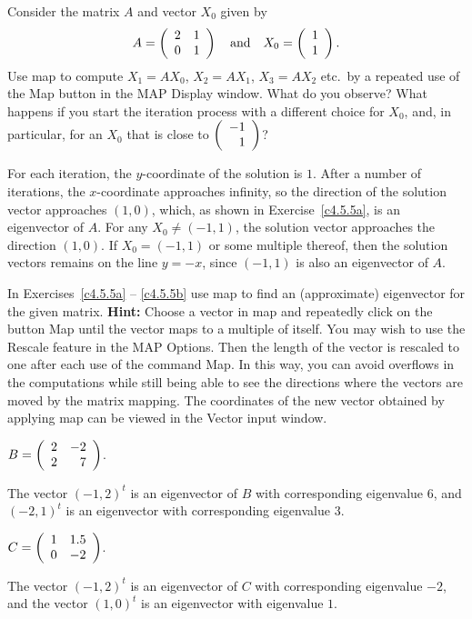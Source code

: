 \documentclass{ximera}
\begin{document}
\CEXER

\begin{exercise} \label{c4.5.6}
Consider the matrix $A$ and vector $X_0$ given by
\[
A=\left(\begin{array}{rr} 2 & 1\\ 0 &1\end{array}\right)\quad\mbox{and}\quad X_0=\left(\begin{array}{r} 1 \\ 1\end{array}\right).
\]
Use {\sf map} to compute $X_1 = AX_0$, $X_2 = AX_1$, $X_3=AX_2$ etc.\ by a
repeated use of the {\sf Map} button in the {\sf MAP Display} window.  What
do you observe?  What happens if you start the iteration process with a
different choice for $X_0$, and, in particular, for an $X_0$ that is close
to $\left(\begin{array}{r} -1 \\ 1\end{array}\right)$?

\begin{solution}

For each iteration, the $y$-coordinate of the solution is $1$.  After a
number of iterations, the $x$-coordinate approaches infinity, so the
direction of the solution vector approaches $(1,0)$, which, as shown
in Exercise~\ref{c4.5.5a}, is an eigenvector of $A$.  For any $X_0
\neq (-1,1)$, the solution vector approaches the direction
$(1,0)$.  If $X_0 = (-1,1)$ or some multiple thereof, then the solution
vectors remains on the line $y = -x$, since $(-1,1)$ is also an
eigenvector of $A$.

\end{solution}
\end{exercise}

\noindent In Exercises~\ref{c4.5.5a} -- \ref{c4.5.5b} use {\sf map} to find
an (approximate) eigenvector for the given matrix.  {\bf Hint:} Choose a
vector in {\sf map} and repeatedly click on the button {\sf Map} until the
vector maps to a multiple of itself.  You may wish to use the {\sf Rescale} 
feature in the {\sf MAP Options}.  Then the length of the vector is rescaled 
to one after each use of the command {\sf Map}. In this way, you can avoid
overflows in the computations while still being able to see the
directions where the vectors are moved by the matrix mapping.  The coordinates 
of the new vector obtained by applying {\sf map} can be viewed in the 
{\sf Vector input} window.

\begin{exercise} \label{c4.5.5a}
$B=\left(\begin{array}{rr} 2 & -2\\ 2 &7\end{array}\right)$.

\begin{solution}
The vector $(-1,2)^t$ is an eigenvector of $B$ with
corresponding eigenvalue $6$, and $(-2,1)^t$ is an eigenvector with
corresponding eigenvalue $3$.


\end{solution}
\end{exercise}
\begin{exercise} \label{c4.5.5b}
$C=\left(\begin{array}{rr} 1 & 1.5\\ 0 &-2\end{array}\right)$.

\begin{solution}
The vector $(-1,2)^t$ is an eigenvector of $C$ with
corresponding eigenvalue $-2$, and the vector $(1,0)^t$ is an eigenvector
with eigenvalue $1$.


\end{solution}
\end{exercise}
\end{document}
